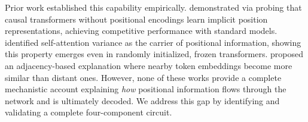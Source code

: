 \documentclass[11pt]{article}
\begin{document}
Prior work established this capability empirically. \citet{haviv2022transformer} demonstrated via probing that causal transformers without positional encodings learn implicit position representations, achieving competitive performance with standard models. \citet{chi-etal-2023-latent} identified self-attention variance as the carrier of positional information, showing this property emerges even in randomly initialized, frozen transformers. \citet{zuo2025position} proposed an adjacency-based explanation where nearby token embeddings become more similar than distant ones. However, none of these works provide a complete mechanistic account explaining \textit{how} positional information flows through the network and is ultimately decoded. We address this gap by identifying and validating a complete four-component circuit.
\end{document}
